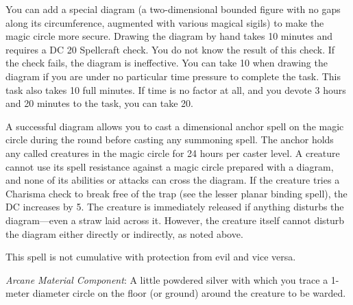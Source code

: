 {	You can add a special diagram (a two-dimensional bounded figure with no gaps along its circumference, augmented with various magical sigils) to make the magic circle more secure. Drawing the diagram by hand takes 10 minutes and requires a DC 20 Spellcraft check. You do not know the result of this check. If the check fails, the diagram is ineffective. You can take 10 when drawing the diagram if you are under no particular time pressure to complete the task. This task also takes 10 full minutes. If time is no factor at all, and you devote 3 hours and 20 minutes to the task, you can take 20.

	A successful diagram allows you to cast a dimensional anchor spell on the magic circle during the round before casting any summoning spell. The anchor holds any called creatures in the magic circle for 24 hours per caster level. A creature cannot use its spell resistance against a magic circle prepared with a diagram, and none of its abilities or attacks can cross the diagram. If the creature tries a Charisma check to break free of the trap (see the lesser planar binding spell), the DC increases by 5. The creature is immediately released if anything disturbs the diagram---even a straw laid across it. However, the creature itself cannot disturb the diagram either directly or indirectly, as noted above.

	This spell is not cumulative with protection from evil and vice versa.

	\textit{Arcane Material Component}:
	A little powdered silver with which you trace a 1-meter diameter circle on the floor (or ground) around the creature to be warded.

}
